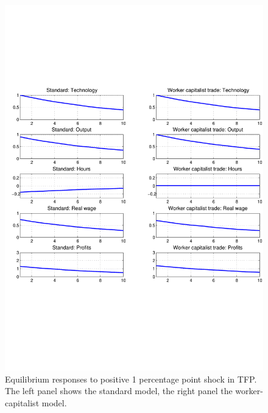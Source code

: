 \begin{figure}[ht] 
\centering 
\includegraphics[trim=0.3cm 7cm 0cm 6cm, clip, width=\textwidth]{./figures/tfp_std_nt.pdf} 
\caption{Equilibrium responses to positive 1 percentage point shock in TFP. The left panel shows the standard model, the right panel the worker-capitalist model.} 
\label{fig_tfp_std_nt} 
\end{figure}